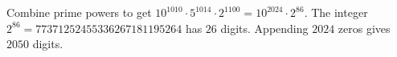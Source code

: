 Combine prime powers to get $10^{1010}\cdot5^{1014}\cdot2^{1100}=10^{2024}\cdot2^{86}$. The integer $2^{86}=77371252455336267181195264$ has $26$ digits. Appending $2024$ zeros gives $\boxed{2050}$ digits.
